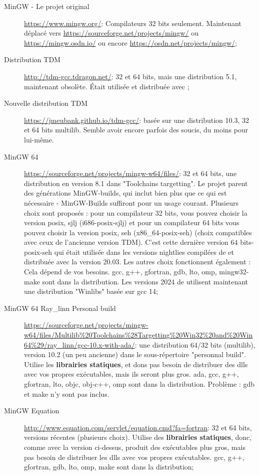 \begin{description}
\item[MinGW - Le projet original] \url{https://www.mingw.org/}: Compilateurs 32 bits seulement. Maintenant déplacé vers \url{https://sourceforge.net/projects/mingw/} ou \url{https://mingw.osdn.io/} ou encore \url{https://osdn.net/projects/mingw/};
\item[Distribution TDM]\url{http://tdm-gcc.tdragon.net/}: 32 et 64 bits, mais une distribution 5.1, maintenant obsolète. Était utilisée et distribuée avec ;
\item[Nouvelle distribution TDM]\url{https://jmeubank.github.io/tdm-gcc/}: basée sur une distribution 10.3, 32 et 64 bits multilib. Semble avoir encore parfois des soucis, du moins pour \codeblocks lui-même.
\item[MinGW 64] \url{https://sourceforge.net/projects/mingw-w64/files/}: 32 et 64 bits, une distribution en version 8.1 dans "Toolchains targetting". Le projet parent des générations MinGW-builds, qui inclut bien plus que ce qui est nécessaire - MinGW-Builds suffiront pour un usage courant. Plusieurs choix sont proposés : pour un compilateur 32 bits, vous pouvez choisir la version posix, sjlj (i686-posix-sjlj) et pour un compilateur 64 bits vous pouvez choisir la version posix, seh (x86\_64-posix-seh) (choix compatibles avec ceux de l'ancienne version TDM). C'est cette dernière version 64 bits-posix-seh qui était utilisée dans les versions nightlies compilées de \codeblocks et distribuée avec la version 20.03. Les autres choix fonctionnent également : Cela dépend de vos besoins. gcc, g++, gfortran, gdb, lto, omp, mingw32-make sont dans la distribution. Les versions 2024 de \codeblocks utilisent maintenant une distribution "Winlibs" basée sur gcc 14;
\item[MinGW 64 Ray\_linn Personal build] \url{https://sourceforge.net/projects/mingw-w64/files/Multilib%20Toolchains%28Targetting%20Win32%20and%20Win64%29/ray_linn/gcc-10.x-with-ada/}: une distribution 64/32 bits (multilib), version 10.2 (un peu ancienne) dans le sous-répertoire "personnal build". Utilise les \textbf{librairies statiques}, et dons pas besoin de distribuer des dlls avec vos propres exécutables, mais ils seront plus gros. ada, gcc, g++, gfortran, lto, objc, obj-c++, omp sont dans la distribution. Problème : gdb et make n'y sont pas inclus.
\item[MinGW Equation] \url{http://www.equation.com/servlet/equation.cmd?fa=fortran}: 32 et 64 bits, versions récentes (plusieurs choix). Utilise des \textbf{librairies statiques}, donc, comme avec la version ci-dessus, produit des exécutables plus gros, mais pas besoin de distribuer les dlls avec vos propres exécutables.  gcc, g++, gfortran, gdb, lto, omp, make sont dans la distribution;

\end{description}
